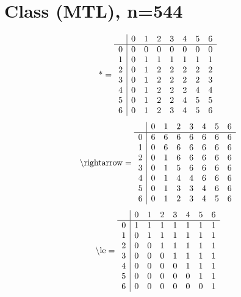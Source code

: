 \documentclass[11pt]{article}
\begin{document}
\section{Class (MTL), n=544}
\[\text{*} = 
\begin{array}{r | r r r r r r r}
 & 0 & 1 & 2 & 3 & 4 & 5 & 6 \\ \hline
0 & 0 & 0 & 0 & 0 & 0 & 0 & 0 \\
1 & 0 & 1 & 1 & 1 & 1 & 1 & 1 \\
2 & 0 & 1 & 2 & 2 & 2 & 2 & 2 \\
3 & 0 & 1 & 2 & 2 & 2 & 2 & 3 \\
4 & 0 & 1 & 2 & 2 & 2 & 4 & 4 \\
5 & 0 & 1 & 2 & 2 & 4 & 5 & 5 \\
6 & 0 & 1 & 2 & 3 & 4 & 5 & 6 \\
\end{array}
\]
\[\text{\textbackslash rightarrow} = 
\begin{array}{r | r r r r r r r}
 & 0 & 1 & 2 & 3 & 4 & 5 & 6 \\ \hline
0 & 6 & 6 & 6 & 6 & 6 & 6 & 6 \\
1 & 0 & 6 & 6 & 6 & 6 & 6 & 6 \\
2 & 0 & 1 & 6 & 6 & 6 & 6 & 6 \\
3 & 0 & 1 & 5 & 6 & 6 & 6 & 6 \\
4 & 0 & 1 & 4 & 4 & 6 & 6 & 6 \\
5 & 0 & 1 & 3 & 3 & 4 & 6 & 6 \\
6 & 0 & 1 & 2 & 3 & 4 & 5 & 6 \\
\end{array}
\]
\[\text{\textbackslash le} = 
\begin{array}{r | r r r r r r r}
 & 0 & 1 & 2 & 3 & 4 & 5 & 6 \\ \hline
0 & 1 & 1 & 1 & 1 & 1 & 1 & 1 \\
1 & 0 & 1 & 1 & 1 & 1 & 1 & 1 \\
2 & 0 & 0 & 1 & 1 & 1 & 1 & 1 \\
3 & 0 & 0 & 0 & 1 & 1 & 1 & 1 \\
4 & 0 & 0 & 0 & 0 & 1 & 1 & 1 \\
5 & 0 & 0 & 0 & 0 & 0 & 1 & 1 \\
6 & 0 & 0 & 0 & 0 & 0 & 0 & 1 \\
\end{array}
\]
\end{document}
